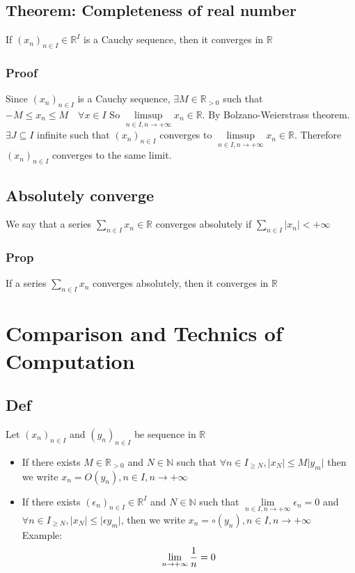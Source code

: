 \documentclass{book}
\begin{document}
\section{Theorem: Completeness of real number}
If $(x_n)_{n\in I}\in\mathbb{R} ^I$ is a Cauchy sequence,
then it converges in $\mathbb{R}$
\subsection*{Proof}
Since $(x_n)_{n\in I}$ is a Cauchy sequence, $\exists M\in \mathbb{R} _{>0}$ such that $-M\leq x_n\leq M\quad \forall x\in I$ So $\limsup\limits_{n\in I,n\rightarrow+\infty}x_n\in \mathbb{R} $. By Bolzano-Weierstrass theorem. $\exists J\subseteq I$ infinite such that $(x_n)_{n\in I}$ converges to $\limsup\limits_{n\in I,n\rightarrow+\infty}x_n\in\mathbb{R} $. Therefore $(x_n)_{n\in I}$ converges to the same limit.
\section{Absolutely converge}
We say that a series $\sum\limits_{n\in I}x_n\in \mathbb{R} $ converges absolutely if $\sum\limits_{n\in I}\lvert x_n\rvert<+\infty$
\subsection{Prop}
If a series $\sum\limits_{n\in I}x_n$ converges absolutely, then it converges in $\mathbb{R}$
\chapter{Comparison and Technics of Computation}
\section{Def}
Let $(x_n)_{n\in I}$ and $(y_n)_{n\in I}$ be sequence in $\mathbb{R} $
\begin{itemize}
    \item If there exists $M\in\mathbb{R} _{>0}$ and $N\in \mathbb{N} $ such that $\forall n\in I_{\geq N},\lvert x_N\rvert\leq M\lvert y_m\rvert$ then we write $x_n=O(y_n),n\in I,n\rightarrow+\infty$
    \item If there exists $(\epsilon_n)_{n\in I}\in \mathbb{R} ^I$ and $N\in\mathbb{N} $ such that $\lim\limits_{n\in I,n\rightarrow+\infty}\epsilon_n=0$ and $\forall n\in I_{\geq N},\lvert x_N\rvert\leq \lvert \epsilon y_m\rvert$, then we write $x_n=\circ(y_n),n\in I,n\rightarrow +\infty$ \\Example:
        $$\lim\limits_{n\rightarrow+\infty}{1\over n}=0$$
\end{itemize}
\end{document}
